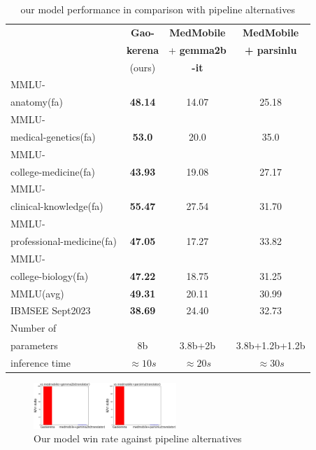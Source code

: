 \documentclass[conference]{IEEEtran}
\begin{document}
\begin{table}[ht]
	\centering
	\caption{our model performance 
		in comparison with pipeline alternatives}
	\begin{tabular}{|l|c|c|c|}  %
		\hline
		\textbf{} & \textbf{Gao-} 
		& \textbf{MedMobile} & \textbf{MedMobile} \\ 
		& \textbf{kerena} & + \textbf{gemma2b} & \textbf{+ parsinlu} \\
		& (ours)  & \textbf{-it} &  \\ \hline
		MMLU- &  &  &  \\ 
		anatomy(fa)  & \textbf{48.14} & 14.07 & 25.18  \\ \hline
		MMLU- &    &  &  \\
		medical-genetics(fa) & \textbf{53.0} & 20.0 & 35.0 \\ \hline
		MMLU- &  &    &  \\
		college-medicine(fa) & \textbf{43.93} & 19.08 & 27.17 \\ \hline
		MMLU- &    &  &  \\
		clinical-knowledge(fa)& \textbf{55.47} & 27.54 & 31.70 \\ \hline
		MMLU- &  &  &  \\
		professional-medicine(fa)& \textbf{47.05} & 17.27 & 33.82 \\ \hline
		MMLU- &  &  &  \\
		college-biology(fa)& \textbf{47.22} & 18.75 & 31.25 \\ \hline
		MMLU(avg) & \textbf{49.31} & 20.11 & 30.99 \\ \hline
		IBMSEE Sept2023 & \textbf{38.69}  & 24.40 & 32.73  \\ \hline
		Number of&  &  &  \\
		parameters & 8b & 3.8b+2b & 3.8b+1.2b+1.2b \\ \hline
		inference time & $\approx 10s$ & $\approx 20s$ & $\approx 30s$ \\  \hline
	\end{tabular}
	\label{tab:model_results_on_mcqa_vs_pipeline_alternative}
\end{table}

\begin{figure}[htbp]
	\centerline{\includegraphics[width=0.48\textwidth]{fig4.png}}
	\caption{Our model win rate against pipeline alternatives}
	\label{fig4}
\end{figure}
\end{document}
